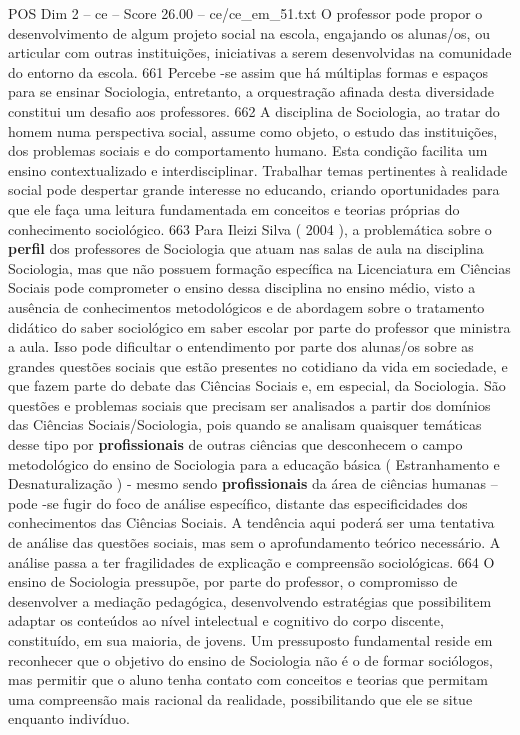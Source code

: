 \begin{textsample}{POS Dim 2 – ce – Score 26.00 – ce/ce\_em\_51.txt}
O professor pode propor o desenvolvimento de algum projeto social na escola, engajando os alunas/os, ou articular com outras instituições, iniciativas a serem desenvolvidas na comunidade do entorno da escola. 661 Percebe -se assim que há múltiplas formas e espaços para se ensinar Sociologia, entretanto, a orquestração afinada desta diversidade constitui um desafio aos professores. 662 A disciplina de Sociologia, ao tratar do homem numa perspectiva social, assume como objeto, o estudo das instituições, dos problemas sociais e do comportamento humano.
Esta condição facilita um ensino contextualizado e interdisciplinar.
Trabalhar temas pertinentes à realidade social pode despertar grande interesse no educando, criando oportunidades para que ele faça uma leitura fundamentada em conceitos e teorias próprias do conhecimento sociológico. 663 Para Ileizi Silva ( 2004 ), a problemática sobre o \textbf{perfil} dos professores de Sociologia que atuam nas salas de aula na disciplina Sociologia, mas que não possuem formação específica na Licenciatura em Ciências Sociais pode comprometer o ensino dessa disciplina no ensino médio, visto a ausência de conhecimentos metodológicos e de abordagem sobre o tratamento didático do saber sociológico em saber escolar por parte do professor que ministra a aula.
Isso pode dificultar o entendimento por parte dos alunas/os sobre as grandes questões sociais que estão presentes no cotidiano da vida em sociedade, e que fazem parte do debate das Ciências Sociais e, em especial, da Sociologia.
São questões e problemas sociais que precisam ser analisados a partir dos domínios das Ciências Sociais/Sociologia, pois quando se analisam quaisquer temáticas desse tipo por \textbf{profissionais} de outras ciências que desconhecem o campo metodológico do ensino de Sociologia para a educação básica ( Estranhamento e Desnaturalização ) - mesmo sendo \textbf{profissionais} da área de ciências humanas – pode -se fugir do foco de análise específico, distante das especificidades dos conhecimentos das Ciências Sociais.
A tendência aqui poderá ser uma tentativa de análise das questões sociais, mas sem o aprofundamento teórico necessário.
A análise passa a ter fragilidades de explicação e compreensão sociológicas. 664 O ensino de Sociologia pressupõe, por parte do professor, o compromisso de desenvolver a mediação pedagógica, desenvolvendo estratégias que possibilitem adaptar os conteúdos ao nível intelectual e cognitivo do corpo discente, constituído, em sua maioria, de jovens.
Um pressuposto fundamental reside em reconhecer que o objetivo do ensino de Sociologia não é o de formar sociólogos, mas permitir que o aluno tenha contato com conceitos e teorias que permitam uma compreensão mais racional da realidade, possibilitando que ele se situe enquanto indivíduo.

\end{textsample}
